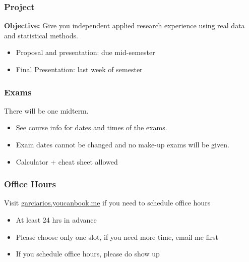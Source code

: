 \documentclass[11pt]{beamer}
\begin{document}
\begin{frame}
\frametitle{Project}

\alert{\textbf{Objective:}} Give you independent applied research experience using real data and 
statistical methods.

\begin{itemize}

\item Proposal and presentation: due mid-semester

\item Final Presentation: last week of semester


\end{itemize}

\end{frame}





\begin{frame}
\frametitle{Exams}



There will be one midterm.
\begin{itemize}
\item See course info for dates and times of the exams. 
\item Exam dates cannot be changed and no make-up exams will be given.
\item Calculator + cheat sheet allowed

\end{itemize}

\end{frame}




\begin{frame}
\frametitle{Office Hours}
Visit \url{garciarios.youcanbook.me} if you need to schedule office hours
\begin{itemize}
\item At least 24 hrs in advance
\item Please choose only one slot, if you need more time, email me first 
\item If you schedule office hours, please do show up 
\end{itemize}
\end{frame}
\end{document}
